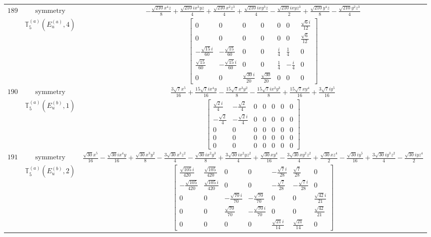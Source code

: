 \documentclass[fleqn,8pt,landscape]{jsarticle}
\begin{document}
\begin{longtable}{ccc}
$ 189 $ & $ \text{symmetry} $ & $ - \frac{\sqrt{210} x^{4} z}{8} + \frac{\sqrt{210} i x^{3} y z}{4} + \frac{\sqrt{210} x^{2} z^{3}}{4} + \frac{\sqrt{210} i x y^{3} z}{4} - \frac{\sqrt{210} i x y z^{3}}{2} + \frac{\sqrt{210} y^{4} z}{8} - \frac{\sqrt{210} y^{2} z^{3}}{4} $ \\
$  $ & $ \mathbb{T}_{5}^{(a)}(E_{u}^{(a)},4) $ & $ \begin{bmatrix} 0 & 0 & 0 & 0 & 0 & 0 & \frac{\sqrt{6} i}{12} \\ 0 & 0 & 0 & 0 & 0 & 0 & \frac{\sqrt{6}}{12} \\ - \frac{\sqrt{15} i}{60} & - \frac{\sqrt{15}}{60} & 0 & 0 & \frac{i}{4} & \frac{1}{4} & 0 \\ \frac{\sqrt{15}}{60} & - \frac{\sqrt{15} i}{60} & 0 & 0 & \frac{1}{4} & - \frac{i}{4} & 0 \\ 0 & 0 & \frac{\sqrt{30} i}{20} & \frac{\sqrt{30}}{20} & 0 & 0 & 0 \end{bmatrix} $ \\ \hline
$ 190 $ & $ \text{symmetry} $ & $ \frac{3 \sqrt{7} x^{5}}{16} + \frac{15 \sqrt{7} i x^{4} y}{16} - \frac{15 \sqrt{7} x^{3} y^{2}}{8} - \frac{15 \sqrt{7} i x^{2} y^{3}}{8} + \frac{15 \sqrt{7} x y^{4}}{16} + \frac{3 \sqrt{7} i y^{5}}{16} $ \\
$  $ & $ \mathbb{T}_{5}^{(a)}(E_{u}^{(b)},1) $ & $ \begin{bmatrix} \frac{\sqrt{2} i}{4} & - \frac{\sqrt{2}}{4} & 0 & 0 & 0 & 0 & 0 \\ - \frac{\sqrt{2}}{4} & - \frac{\sqrt{2} i}{4} & 0 & 0 & 0 & 0 & 0 \\ 0 & 0 & 0 & 0 & 0 & 0 & 0 \\ 0 & 0 & 0 & 0 & 0 & 0 & 0 \\ 0 & 0 & 0 & 0 & 0 & 0 & 0 \end{bmatrix} $ \\ \hline
$ 191 $ & $ \text{symmetry} $ & $ \frac{\sqrt{30} x^{5}}{16} - \frac{\sqrt{30} i x^{4} y}{16} + \frac{\sqrt{30} x^{3} y^{2}}{8} - \frac{3 \sqrt{30} x^{3} z^{2}}{4} - \frac{\sqrt{30} i x^{2} y^{3}}{8} + \frac{3 \sqrt{30} i x^{2} y z^{2}}{4} + \frac{\sqrt{30} x y^{4}}{16} - \frac{3 \sqrt{30} x y^{2} z^{2}}{4} + \frac{\sqrt{30} x z^{4}}{2} - \frac{\sqrt{30} i y^{5}}{16} + \frac{3 \sqrt{30} i y^{3} z^{2}}{4} - \frac{\sqrt{30} i y z^{4}}{2} $ \\
$  $ & $ \mathbb{T}_{5}^{(a)}(E_{u}^{(b)},2) $ & $ \begin{bmatrix} \frac{\sqrt{105} i}{420} & \frac{\sqrt{105}}{420} & 0 & 0 & - \frac{\sqrt{7} i}{28} & \frac{\sqrt{7}}{28} & 0 \\ - \frac{\sqrt{105}}{420} & \frac{\sqrt{105} i}{420} & 0 & 0 & - \frac{\sqrt{7}}{28} & - \frac{\sqrt{7} i}{28} & 0 \\ 0 & 0 & - \frac{\sqrt{70} i}{70} & - \frac{\sqrt{70}}{70} & 0 & 0 & \frac{\sqrt{42} i}{21} \\ 0 & 0 & \frac{\sqrt{70}}{70} & - \frac{\sqrt{70} i}{70} & 0 & 0 & \frac{\sqrt{42}}{21} \\ 0 & 0 & 0 & 0 & \frac{\sqrt{21} i}{14} & \frac{\sqrt{21}}{14} & 0 \end{bmatrix} $ \\ \hline

\end{longtable}
\end{document}
